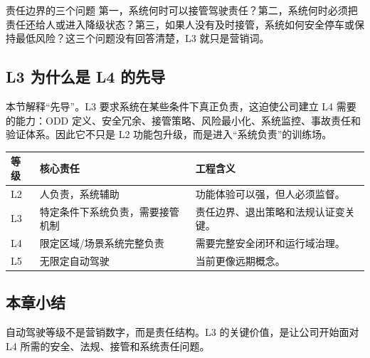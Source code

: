 \begin{importantbox}{责任边界的三个问题}
第一，系统何时可以接管驾驶责任？第二，系统何时必须把责任还给人或进入降级状态？第三，如果人没有及时接管，系统如何安全停车或保持最低风险？这三个问题没有回答清楚，L3 就只是营销词。
\end{importantbox}

\subsection{L3 为什么是 L4 的先导}

本节解释“先导”。L3 要求系统在某些条件下真正负责，这迫使公司建立 L4 需要的能力：ODD 定义、安全冗余、接管策略、风险最小化、系统监控、事故责任和验证体系。因此它不只是 L2 功能包升级，而是进入“系统负责”的训练场。

\noindent\begin{tabularx}{\textwidth}{p{}p{}X}
\toprule
等级 & 核心责任 & 工程含义 \\
\midrule
L2 & 人负责，系统辅助 & 功能体验可以强，但人必须监督。 \\
L3 & 特定条件下系统负责，需要接管机制 & 责任边界、退出策略和法规认证变关键。 \\
L4 & 限定区域/场景系统完整负责 & 需要完整安全闭环和运行域治理。 \\
L5 & 无限定自动驾驶 & 当前更像远期概念。 \\
\bottomrule
\end{tabularx}

\subsection{本章小结}

自动驾驶等级不是营销数字，而是责任结构。L3 的关键价值，是让公司开始面对 L4 所需的安全、法规、接管和系统责任问题。

